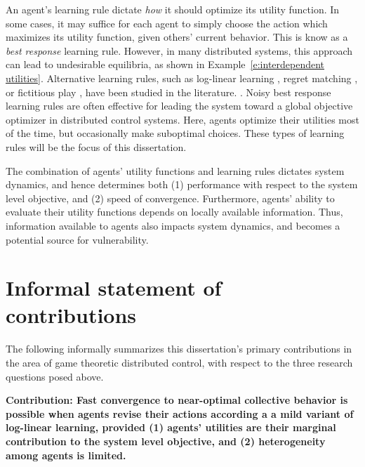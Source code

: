 An agent's learning rule dictate {\it how} it should optimize its utility function. In some cases, it may suffice for each agent to simply choose the action which maximizes its utility function, given others' current behavior. This is know as a {\it best response} learning rule. However, in many distributed systems, this approach can lead to undesirable equilibria, as shown in Example~\ref{e:interdependent utilities}. Alternative learning rules, such as log-linear learning \cite{Blume1993}, regret matching \cite{blah}, or fictitious play \cite{blah}, have been studied in the literature. . Noisy best response learning rules are often effective for leading the system toward a global objective optimizer in distributed control systems. Here, agents optimize their utilities most of the time, but occasionally make suboptimal choices. These types of learning rules will be the focus of this dissertation.

The combination of agents' utility functions and learning rules dictates system dynamics, and hence determines both (1) performance with respect to the system level objective, and (2) speed of convergence. Furthermore, agents' ability to evaluate their utility functions depends on locally available information. Thus, information available to agents also impacts system dynamics, and becomes a potential source for vulnerability.




\section{Informal statement of contributions}


The following informally summarizes this dissertation's primary contributions in the area of game theoretic distributed control, with respect to the three research questions posed above.


\smallskip

\noindent \textbf{Contribution: Fast convergence to near-optimal collective behavior is possible when agents revise their actions according a a mild variant of log-linear learning, provided (1) agents' utilities are their marginal contribution to the system level objective, and (2) heterogeneity among agents is limited.}



